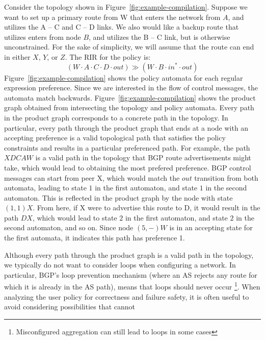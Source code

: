 Consider the topology shown in Figure~\ref{fig:example-compilation}. Suppose we want to set up a primary route from W that enters the network from $A$, and utilizes the A -- C and C -- D links. We also would like a backup route that utilizes enters from node $B$, and utilizes the B -- C link, but is otherwise unconstrained. For the sake of simplicity, we will assume that the route can end in either $X$, $Y$, or $Z$. The RIR for the policy is:
%
$$(W \cdot A \cdot C \cdot D \cdot out) \gg (W \cdot B \cdot in^* \cdot out)$$
%
Figure~\ref{fig:example-compilation} shows the policy automata for each regular expression preference. Since we are interested in the flow of control messages, the automata match backwards. Figure~\ref{fig:example-compilation} shows the product graph obtained from intersecting the topology and policy automata. Every path in the product graph corresponds to a concrete path in the topology. In particular, every path through the product graph that ends at a node with an accepting preference is a valid topological path that satisfies the policy constraints and results in a particular preferenced path.
%
For example, the path $X D C A W$ is a valid path in the topology that BGP route advertisements might take, which would lead to obtaining the most prefered preference.
BGP control messages can start from peer X, which would match the $out$ transition from both automata, leading to state $1$ in the first automaton, and state $1$ in the second automaton. This is reflected in the product graph by the node with state $(1,1) X$. From here, if X were to advertise this route to D, it would result in the path $D X$, which would lead to state $2$ in the first automaton, and state $2$ in the second automaton, and so on. Since node $(5,-) W$ is in an accepting state for the first automata, it indicates this path has preference 1.



Although every path through the product graph is a valid path in the topology, we typically do not want to consider loops when configuring a network. In particular, BGP's loop prevention mechanism (where an AS rejects any route for which it is already in the AS path), means that loops should never occur \footnote{Misconfigured aggregation can still lead to loops in some cases}. When analyzing the user policy for correctness and failure safety, it is often useful to avoid considering possibilities that cannot  









